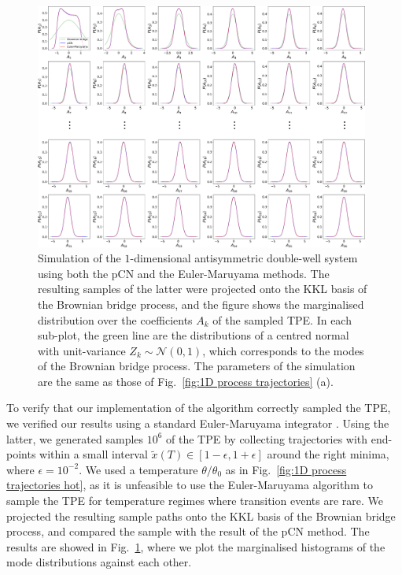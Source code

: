 \begin{figure}[t]
\includegraphics[width=0.98\textwidth]{figs_part1/mcmc/1D_process_MCMC_vs_Langevin}
\centering \caption{Simulation of the $1$-dimensional antisymmetric double-well system using both the pCN and the Euler-Maruyama methods. The resulting samples of the latter were projected onto the KKL basis of the Brownian bridge process, and the figure shows the marginalised distribution over the coefficients $A_k$ of the sampled TPE. In each sub-plot, the green line are the distributions of a centred normal with unit-variance $Z_k \sim \mathcal{N}(0,1)$, which corresponds to the modes of the Brownian bridge process. The parameters of the simulation are the same as those of Fig.~\ref{fig:1D process trajectories} (a).}
\label{fig:1D process MCMC vs Euler-Maruyama} 
\end{figure}

To verify that our implementation of the algorithm correctly sampled the TPE, we verified our results using a standard Euler-Maruyama integrator \citep{kloedenNumericalSolutionStochastic2011}. Using the latter, we generated samples $10^6$ of the TPE by collecting trajectories
with end-points within a small interval $\tilde{x}(T)\in[1-\epsilon,1+\epsilon]$
around the right minima, where $\epsilon=10^{-2}$. We used a temperature $\theta / \theta_0$ as in Fig.~\ref{fig:1D process trajectories hot}, as it is unfeasible to use the Euler-Maruyama algorithm to sample the TPE for temperature regimes where transition events are rare. We projected the resulting sample paths onto the KKL basis of the Brownian bridge process, and compared the sample with the result of the pCN method. The results are showed in Fig.~\ref{fig:1D process MCMC vs Euler-Maruyama}, where we plot the marginalised histograms of the mode distributions against each other.

